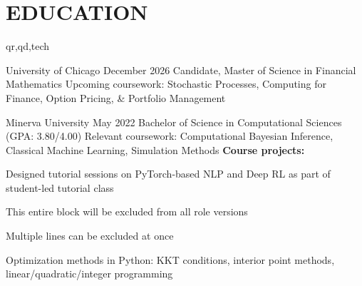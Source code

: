 \section{EDUCATION}
\begin{rolecontent}{qr,qd,tech}
\begin{education_xp}[Chicago, IL]
                   {University of Chicago}
                   {December 2026}
                   {Candidate, Master of Science in Financial Mathematics}
    Upcoming coursework: Stochastic Processes, Computing for Finance, Option Pricing, \& Portfolio Management
    \begin{highlights}
    \end{highlights}
\end{education_xp}
\end{rolecontent}
\vspace{0.1 cm}
\begin{education_xp}
                   {Minerva University}
                   {May 2022}
                   {Bachelor of Science in Computational Sciences (GPA: 3.80/4.00)}
    Relevant coursework: Computational Bayesian Inference, Classical Machine Learning, Simulation Methods\newline
    \textbf{Course projects:}
    \begin{highlights}
        \item Designed tutorial sessions on PyTorch-based NLP and Deep RL as part of student-led tutorial class
        \begin{exclude}
        \item This entire block will be excluded from all role versions
        \item Multiple lines can be excluded at once
        \end{exclude}
        \item Optimization methods in Python: KKT conditions, interior point methods, linear/quadratic/integer programming
    \end{highlights}
\end{education_xp}

